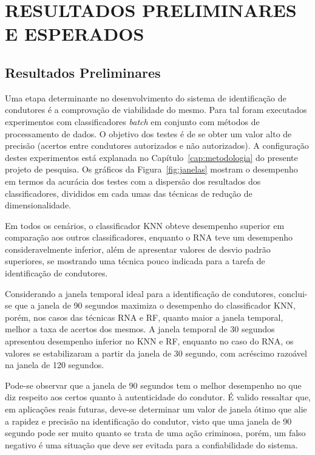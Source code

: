 \chapter{RESULTADOS PRELIMINARES E ESPERADOS}
\label{cap:resultados}

\section{Resultados Preliminares}

Uma etapa determinante no desenvolvimento do sistema de identificação de condutores é a comprovação de viabilidade do mesmo. Para tal foram executados experimentos com classificadores \textit{batch} em conjunto com métodos de processamento de dados. O objetivo dos testes é de se obter um valor alto de precisão (acertos entre condutores autorizados e não autorizados). A configuração destes experimentos está explanada no Capítulo~\ref{cap:metodologia} do presente projeto de pesquisa. Os gráficos da Figura~\ref{fig:janelas} mostram o desempenho em termos da acurácia dos testes com a dispersão dos resultados dos classificadores, divididos em cada umas das técnicas de redução de dimensionalidade.

Em todos os cenários, o classificador KNN obteve desempenho superior em comparação aos outros classificadores, enquanto o RNA teve um desempenho consideravelmente inferior, além de apresentar valores de desvio padrão superiores, se mostrando uma técnica pouco indicada para a tarefa de identificação de condutores.

Considerando a janela temporal ideal para a identificação de condutores, conclui-se que a janela de 90 segundos maximiza o desempenho do classificador KNN, porém, nos casos das técnicas RNA e RF, quanto maior a janela temporal, melhor a taxa de acertos dos mesmos. A janela temporal de 30 segundos apresentou desempenho inferior no KNN e RF, enquanto no caso do RNA, os valores se estabilizaram a partir da janela de 30 segundo, com acréscimo razoável na janela de 120 segundos. 

Pode-se observar que a janela de 90 segundos tem o melhor desempenho no que diz respeito aos certos quanto à autenticidade do condutor. É valido ressaltar que, em aplicações reais futuras, deve-se determinar um valor de janela ótimo que alie a rapidez e precisão na identificação do condutor, visto que uma janela de 90 segundo pode ser muito quanto se trata de uma ação criminosa, porém, um falso negativo é uma situação que deve ser evitada para a confiabilidade do sistema.


